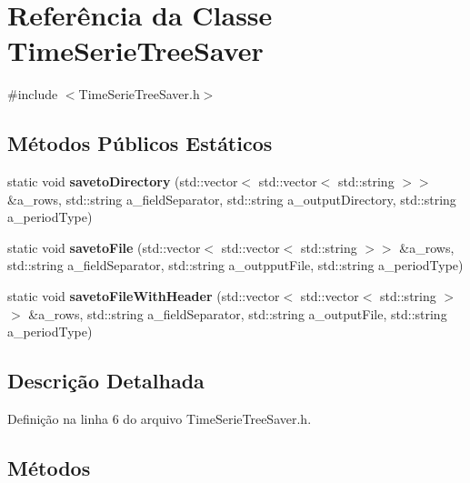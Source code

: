 \section{Referência da Classe Time\+Serie\+Tree\+Saver}
\label{class_time_serie_tree_saver}


{\ttfamily \#include $<$Time\+Serie\+Tree\+Saver.\+h$>$}

\subsection*{Métodos Públicos Estáticos}
\begin{DoxyCompactItemize}
\item 
static void {\bf saveto\+Directory} (std\+::vector$<$ std\+::vector$<$ std\+::string $>$$>$ \&a\+\_\+rows, std\+::string a\+\_\+field\+Separator, std\+::string a\+\_\+output\+Directory, std\+::string a\+\_\+period\+Type)
\item 
static void {\bf saveto\+File} (std\+::vector$<$ std\+::vector$<$ std\+::string $>$$>$ \&a\+\_\+rows, std\+::string a\+\_\+field\+Separator, std\+::string a\+\_\+outpput\+File, std\+::string a\+\_\+period\+Type)
\item 
static void {\bf saveto\+File\+With\+Header} (std\+::vector$<$ std\+::vector$<$ std\+::string $>$$>$ \&a\+\_\+rows, std\+::string a\+\_\+field\+Separator, std\+::string a\+\_\+output\+File, std\+::string a\+\_\+period\+Type)
\end{DoxyCompactItemize}


\subsection{Descrição Detalhada}


Definição na linha 6 do arquivo Time\+Serie\+Tree\+Saver.\+h.



\subsection{Métodos}
